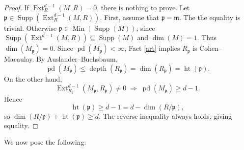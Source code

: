 \documentclass[10pt,a4paper]{amsart}
\newcommand{\Ext}{\operatorname{Ext}}
\newcommand{\Min}{\operatorname{Min}}
\newcommand{\Supp}{\operatorname{Supp}}
\newcommand{\depth}{\operatorname{depth}}
\newcommand{\pd}{\operatorname{pd}}
\begin{document}
\begin{proof}
	If $\Ext^{d-1}_R(M,R)=0$, there is nothing to prove. Let $\mathfrak p \in \Supp(\Ext^{d-1}_R(M,R))$.
First, assume that $\mathfrak p = \mathfrak m$. The the equality is trivial. Otherwise $\mathfrak p \in \Min(\Supp(M))$, since $\Supp(\Ext^{d-1}(M,R)) \subseteq \Supp(M)$ and $\dim(M)=1$. Thus $\dim(M_{\mathfrak p})=0$.
	Since $\pd(M_{\mathfrak p})<\infty$, Fact \ref{art} implies $R_{\mathfrak p}$ is Cohen–Macaulay. By Auslander–Buchsbaum,
	\[
	\pd(M_{\mathfrak p}) \le \depth(R_{\mathfrak p}) = \dim(R_{\mathfrak p}) = \operatorname{ht}(\mathfrak p).
	\]
	On the other hand,
	\[
	\Ext^{d-1}_{R_{\mathfrak p}}(M_{\mathfrak p}, R_{\mathfrak p}) \neq 0
	\;\Rightarrow\;
	\pd(M_{\mathfrak p}) \ge d-1.
	\]
	Hence
	\[
	\operatorname{ht}(\mathfrak p) \ge d-1 = d - \dim(R/\mathfrak p),
	\]
	so
	\(
	\dim(R/\mathfrak p) + \operatorname{ht}(\mathfrak p) \ge d.
	\)
	The reverse inequality always holds, giving equality.
\end{proof}We now pose the following:
\end{document}
